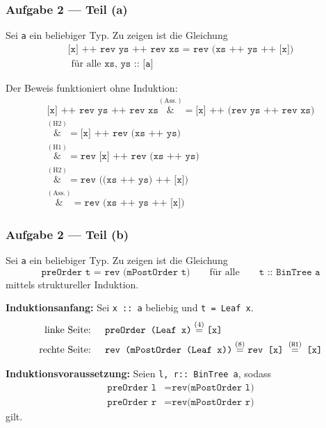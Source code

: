 \documentclass{beamer}
\newcommand{\step}[2][]{\ensuremath{\overset{{#1} (\text{#2})}{=}}}
\newcommand*{\astep}[2][]{\ensuremath{\overset{{#1} (\text{#2})}&{=}}}
\begin{document}
\begin{frame} \frametitle{Aufgabe 2 --- Teil (a)}
	\scriptsize
	Sei \texttt{a} ein beliebiger Typ. Zu zeigen ist die Gleichung
	\begin{equation}
		\begin{aligned}
			\texttt{[x] ++ rev ys ++ rev xs = rev (xs ++ ys ++ [x])} \\ \text{ für alle } \texttt{xs, ys :: [a]}
		\end{aligned}
		\tag{H3}
	\end{equation}
	
	Der Beweis funktioniert ohne Induktion:
	\begin{align*}
		\texttt{[x] ++ rev ys ++ rev xs}
		\astep{Ass.} 
		\texttt{[x] ++ (rev ys ++ rev xs)} \\
		\astep{H2} \texttt{[x] ++ rev (xs ++ ys)} \\
		\astep{H1} \texttt{rev [x] ++ rev (xs ++ ys)} \\
		\astep{H2} \texttt{rev ((xs ++ ys) ++ [x])} \\
		\astep{Ass.} \texttt{rev (xs ++ ys ++ [x])}
	\end{align*}
\end{frame}

\begin{frame} \frametitle{Aufgabe 2 --- Teil (b)}
	\scriptsize
	Sei \texttt{a} ein beliebiger Typ. Zu zeigen ist die Gleichung
	\begin{equation*}
		\texttt{preOrder t = rev (mPostOrder t)} \qquad \text{für alle} \qquad \texttt{t :: BinTree a}
	\end{equation*}
	mittels struktureller Induktion.
	
	\textbf{Induktionsanfang:} Sei \texttt{x :: a} beliebig und \texttt{t = Leaf x}. 
	\begin{align*}
		\text{linke Seite: } \quad &\texttt{preOrder (Leaf x)} \step{4} \texttt{[x]} \\
		\text{rechte Seite: } \quad & \texttt{rev (mPostOrder (Leaf x))} \step{8} \texttt{rev [x] \step{H1} [x]}
	\end{align*}
	
	\textbf{Induktionsvoraussetzung:} Seien \texttt{l, r:: BinTree a}, sodass
	\begin{align}
		\texttt{preOrder l} &= \texttt{rev(mPostOrder l)} \tag{IV1} \\
		\texttt{preOrder r} &= \texttt{rev(mPostOrder r)} \tag{IV2}
	\end{align}
	gilt.
\end{frame}
\end{document}
